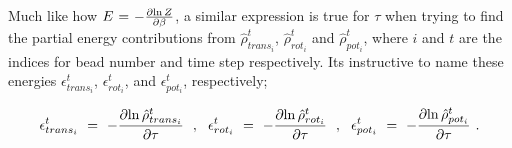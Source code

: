 \documentclass{ece}
\begin{document}
Much like how \begin{math} E \hspace{0.025cm} = \hspace{0.025cm} - \frac{\partial{\ln{Z}}}{\partial{\beta}} \end{math}, a similar expression is true for \begin{math} \tau \end{math} when trying to find the partial energy contributions from \begin{math} \hat{\rho}_{trans_i}^t \end{math}, \begin{math} \hat{\rho}_{rot_i}^t \end{math} and \begin{math} \hat{\rho}_{pot_i}^t \end{math}, where \begin{math} i \end{math} and \begin{math} t \end{math} are the indices for bead number and time step respectively. Its instructive to name these energies \begin{math} \epsilon_{trans_i}^t \end{math}, \begin{math} \epsilon_{rot_i}^t \end{math}, and \begin{math} \epsilon_{pot_i}^t \end{math}, respectively;

\begin{equation} \label{eq:58}
\epsilon_{trans_i}^t \hspace{0.125cm} = \hspace{0.125cm} - \frac{\partial{\ln{\hat{\rho}_{trans_i}^t}}}{\partial{\tau}} \hspace{0.225cm} , \hspace{0.225cm} \epsilon_{rot_i}^t \hspace{0.125cm} = \hspace{0.125cm} - \frac{\partial{\ln{\hat{\rho}_{rot_i}^t}}}{\partial{\tau}} \hspace{0.225cm} , \hspace{0.225cm} \epsilon_{pot_i}^t \hspace{0.125cm} = \hspace{0.125cm} - \frac{\partial{\ln{\hat{\rho}_{pot_i}^t}}}{\partial{\tau}}\hspace{0.125cm} .
\end{equation}
\end{document}
